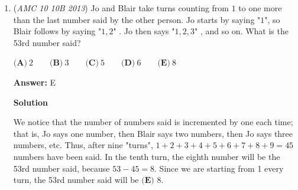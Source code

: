 \begin{enumerate}
 



\textbf{Solution 2}

We can divide this problem into two cases.Case 1: Side;In this case, there is a $\frac{5}{10}$ chance of picking a side, and a $\frac{4}{9}$ chance of picking another side.Case 2: Diagonal;This case is similar to the first, for again, there is a $\frac{5}{10}$ chance of picking a diagonal, and a $\frac{4}{9}$ chance of picking another diagonal.

 Summing these cases up gives us a probability of $\boxed{\textbf{(B) }\frac{4}{9}}$.

 



\textbf{Solution 3}

One way to do this is to use combinations.We know that there are $\binom{10}{2} = 45$ ways to select two segments. The ways in which you get 2 segments of the same length are if you choose two sides, or two diagonals. Thus, there are $2 \times \binom{5}{2}$ = 20 ways in which you end up with two segments of the same length. $\frac{20}{45}$ is equivalent to $\boxed{\textbf{(B) }\frac{4}{9}}$.

 



\textbf{Solution 4}

The problem is simply asking how many ways are there to choose two sides or two diagonals. Hence, the probability is 
 \[\dfrac{\binom{5}{2} + \binom{5}{2}}{\binom{10}{2}} = \dfrac{10+10}{45} = \dfrac{20}{45}=\boxed{\textbf{(B) }\dfrac49}\].

 


	\item (\textit{AMC 10 10B 2013}) Jo and Blair take turns counting from $1$ to one more than the last number said by the other person. Jo starts by saying "$1$", so Blair follows by saying "$1, 2$" . Jo then says "$1, 2, 3$" , and so on. What is the 53rd number said?


 $\textbf{(A)}\ 2\qquad\textbf{(B)}\ 3\qquad\textbf{(C)}\ 5\qquad\textbf{(D)}\ 6\qquad\textbf{(E)}\ 8$

 \textbf{Answer: }E



\textbf{Solution}

We notice that the number of numbers said is incremented by one each time; that is, Jo says one number, then Blair says two numbers, then Jo says three numbers, etc.  Thus, after nine "turns", $1+2+3+4+5+6+7+8+9=45$ numbers have been said.  In the tenth turn, the eighth number will be the 53rd number said, because $53-45=8$.  Since we are starting from 1 every turn, the 53rd number said will be $\boxed{\textbf{(E) }8}$.


\end{enumerate}
